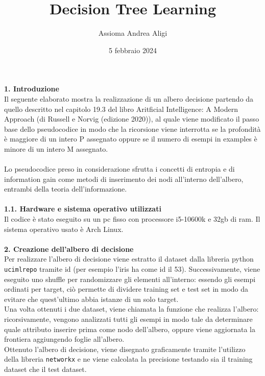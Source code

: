 \documentclass{article}
\begin{document}
\title{\textbf{Decision Tree Learning}}
\author{Assioma Andrea Aligi}
\date{5 febbraio 2024}
\maketitle


{\Large \textbf{1. Introduzione}}\\
Il seguente elaborato mostra la realizzazione di un albero decisione partendo da quello descritto nel capitolo 19.3 del libro Aritficial Intelligence: A Modern Approach  
(di Russell e Norvig (edizione 2020)), al quale viene modificato il passo base dello pseudocodice in modo che la ricorsione viene interrotta se la profondità è maggiore 
di un intero P assegnato oppure se il numero di esempi in examples è minore di un intero M assegnato.\\
\\
Lo pseudocodice preso in considerazione sfrutta i concetti di entropia e di information gain come metodi di inserimento dei nodi all'interno dell'albero, entrambi della teoria
dell'informazione.\\
\\
{\Large \textbf{{\large{1}}.{\small{1}}. Hardware e sistema operativo utilizzati}}\\
Il codice è stato eseguito su un pc fisso con processore i5-10600k e 32gb di ram. Il sistema operativo usato è Arch Linux.\\
\\
{\Large \textbf{2. Creazione dell'albero di decisione}}\\
Per realizzare l'albero di decisione viene estratto il dataset dalla libreria python \texttt{ucimlrepo} tramite id (per esempio l'iris ha come id il 53). Successivamente, viene eseguito uno
shuffle per randomizzare gli elementi all'interno: essendo gli esempi ordinati per target, ciò permette di dividere training set e test 
set in modo da evitare che quest'ultimo abbia istanze di un solo target.\\
Una volta ottenuti i due dataset, viene chiamata la funzione che realizza l'albero: ricorsivamente, vengono analizzati tutti gli esempi in modo tale da determinare quale attributo
inserire prima come nodo dell'albero, oppure viene aggiornata la frontiera aggiungendo foglie all'albero.\\
Ottenuto l'albero di decisione, viene disegnato graficamente tramite l'utilizzo della libreria \texttt{networkx} e ne viene calcolata la precisione testando sia il training dataset
che il test dataset.\\
\end{document}
